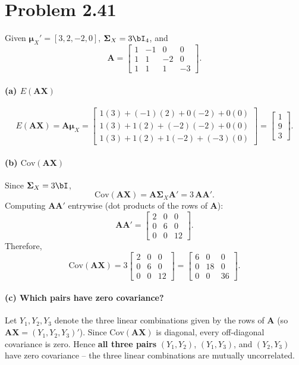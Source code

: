 \documentclass[11pt]{article}
\newcommand{\bA}{\mathbf{A}}
\newcommand{\bX}{\mathbf{X}}
\newcommand{\bSigma}{\boldsymbol{\Sigma}}
\newcommand{\bmu}{\boldsymbol{\mu}}
\begin{document}
\section*{Problem 2.41}

Given $\bmu_X' = [3,2,-2,0]$, $\bSigma_X = 3\bI_4$, and
\[
\bA = \begin{bmatrix} 1 & -1 & 0 & 0 \\ 1 & 1 & -2 & 0 \\ 1 & 1 & 1 & -3 \end{bmatrix}.
\]

\paragraph{(a) $E(\bA\bX)$}
\[
E(\bA\bX) = \bA\bmu_X =
\begin{bmatrix}
1(3)+(-1)(2)+0(-2)+0(0) \\
1(3)+1(2)+(-2)(-2)+0(0) \\
1(3)+1(2)+1(-2)+(-3)(0)
\end{bmatrix}
=
\begin{bmatrix} 1 \\ 9 \\ 3 \end{bmatrix}.
\]

\paragraph{(b) $\mathrm{Cov}(\bA\bX)$}
Since $\bSigma_X = 3\bI$,
\[
\mathrm{Cov}(\bA\bX) = \bA\bSigma_X\bA' = 3\,\bA\bA'.
\]
Computing $\bA\bA'$ entrywise (dot products of the rows of $\bA$):
\[
\bA\bA' = \begin{bmatrix} 2 & 0 & 0 \\ 0 & 6 & 0 \\ 0 & 0 & 12 \end{bmatrix}.
\]
Therefore,
\[
\mathrm{Cov}(\bA\bX) = 3\begin{bmatrix} 2 & 0 & 0 \\ 0 & 6 & 0 \\ 0 & 0 & 12 \end{bmatrix}
= \begin{bmatrix} 6 & 0 & 0 \\ 0 & 18 & 0 \\ 0 & 0 & 36 \end{bmatrix}.
\]

\paragraph{(c) Which pairs have zero covariance?}
Let $Y_1, Y_2, Y_3$ denote the three linear combinations given by the rows of $\bA$ (so $\bA\bX = (Y_1,Y_2,Y_3)'$). Since $\mathrm{Cov}(\bA\bX)$ is diagonal, every off-diagonal covariance is zero. Hence \textbf{all three pairs} $(Y_1,Y_2)$, $(Y_1,Y_3)$, and $(Y_2,Y_3)$ have zero covariance -- the three linear combinations are mutually uncorrelated.
\end{document}
